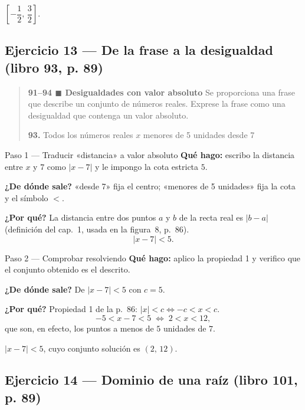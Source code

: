 \documentclass[11pt]{article}
\begin{document}
\begin{resp}
$\left[-\dfrac12,\,\dfrac32\right]$.
\end{resp}

\subsection*{Ejercicio 13 --- De la frase a la desigualdad (libro 93, p. 89)}

\begin{quote}
\textbf{91--94 $\blacksquare$ Desigualdades con valor absoluto} \; Se proporciona una frase que describe un conjunto de números reales. Exprese la frase como una desigualdad que contenga un valor absoluto.

\textbf{93.} Todos los números reales $x$ menores de 5 unidades desde 7
\end{quote}

\begin{paso}{Paso 1 --- Traducir «distancia» a valor absoluto}
\textbf{Qué hago:} escribo la distancia entre $x$ y $7$ como $|x-7|$ y le impongo la cota estricta $5$.

\textbf{¿De dónde sale?} «desde 7» fija el centro; «menores de 5 unidades» fija la cota y el símbolo $<$.

\textbf{¿Por qué?} La distancia entre dos puntos $a$ y $b$ de la recta real es $|b-a|$ (definición del cap.~1, usada en la figura~8, p.~86).
\[
|x-7|<5.
\]
\end{paso}

\begin{paso}{Paso 2 --- Comprobar resolviendo}
\textbf{Qué hago:} aplico la propiedad 1 y verifico que el conjunto obtenido es el descrito.

\textbf{¿De dónde sale?} De $|x-7|<5$ con $c=5$.

\textbf{¿Por qué?} Propiedad 1 de la p.~86: $|x|<c \iff -c<x<c$.
\[
-5<x-7<5 \;\Longleftrightarrow\; 2<x<12,
\]
que son, en efecto, los puntos a menos de $5$ unidades de $7$.
\end{paso}

\begin{resp}
$|x-7|<5$, cuyo conjunto solución es $(2,\,12)$.
\end{resp}

\subsection*{Ejercicio 14 --- Dominio de una raíz (libro 101, p. 89)}
\end{document}
